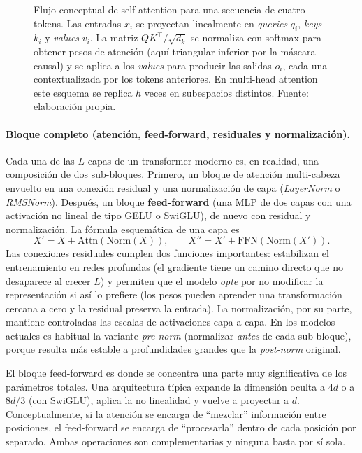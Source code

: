 \documentclass[11pt,a4paper]{article}
\begin{document}
\begin{figure}[H]
{%
}%
\caption{Flujo conceptual de self-attention para una secuencia de cuatro tokens. Las entradas $x_i$ se proyectan linealmente en \emph{queries} $q_i$, \emph{keys} $k_i$ y \emph{values} $v_i$. La matriz $QK^{\top}/\sqrt{d_k}$ se normaliza con softmax para obtener pesos de atención (aquí triangular inferior por la máscara causal) y se aplica a los \emph{values} para producir las salidas $o_i$, cada una contextualizada por los tokens anteriores. En multi-head attention este esquema se replica $h$ veces en subespacios distintos. Fuente: elaboración propia.}
\label{fig:self-attention}
\end{figure}

\paragraph{Bloque completo (atención, feed-forward, residuales y normalización).} Cada una de las $L$ capas de un transformer moderno es, en realidad, una composición de dos sub-bloques. Primero, un bloque de atención multi-cabeza envuelto en una conexión residual y una normalización de capa (\textit{LayerNorm} o \textit{RMSNorm}). Después, un bloque \textbf{feed-forward} (una MLP de dos capas con una activación no lineal de tipo GELU o SwiGLU), de nuevo con residual y normalización. La fórmula esquemática de una capa es
\[
X' = X + \mathrm{Attn}(\mathrm{Norm}(X)),\qquad
X'' = X' + \mathrm{FFN}(\mathrm{Norm}(X')).
\]
Las conexiones residuales cumplen dos funciones importantes: estabilizan el entrenamiento en redes profundas (el gradiente tiene un camino directo que no desaparece al crecer $L$) y permiten que el modelo \emph{opte} por no modificar la representación si así lo prefiere (los pesos pueden aprender una transformación cercana a cero y la residual preserva la entrada). La normalización, por su parte, mantiene controladas las escalas de activaciones capa a capa. En los modelos actuales es habitual la variante \textit{pre-norm} (normalizar \emph{antes} de cada sub-bloque), porque resulta más estable a profundidades grandes que la \textit{post-norm} original.

El bloque feed-forward es donde se concentra una parte muy significativa de los parámetros totales. Una arquitectura típica expande la dimensión oculta a $4d$ o a $8d/3$ (con SwiGLU), aplica la no linealidad y vuelve a proyectar a $d$. Conceptualmente, si la atención se encarga de ``mezclar'' información entre posiciones, el feed-forward se encarga de ``procesarla'' dentro de cada posición por separado. Ambas operaciones son complementarias y ninguna basta por sí sola.
\end{document}
